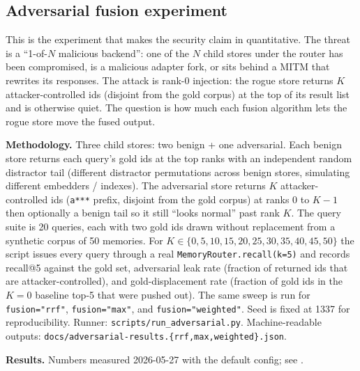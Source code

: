 \documentclass[11pt,letterpaper,twocolumn]{article}
\begin{document}
\subsection{Adversarial fusion experiment}
\label{sec:eval-adversarial}

This is the experiment that makes the security claim in  quantitative. The threat is a ``1-of-$N$ malicious backend'': one of the $N$ child stores under the router has been compromised, is a malicious adapter fork, or sits behind a MITM that rewrites its responses. The attack is rank-0 injection: the rogue store returns $K$ attacker-controlled ids (disjoint from the gold corpus) at the top of its result list and is otherwise quiet. The question is how much each fusion algorithm lets the rogue store move the fused output.

\textbf{Methodology.} Three child stores: two benign + one adversarial. Each benign store returns each query's gold ids at the top ranks with an independent random distractor tail (different distractor permutations across benign stores, simulating different embedders / indexes). The adversarial store returns $K$ attacker-controlled ids (\texttt{a***} prefix, disjoint from the gold corpus) at ranks $0$ to $K-1$ then optionally a benign tail so it still ``looks normal'' past rank $K$. The query suite is 20 queries, each with two gold ids drawn without replacement from a synthetic corpus of 50 memories. For $K \in \{0, 5, 10, 15, 20, 25, 30, 35, 40, 45, 50\}$ the script issues every query through a real \texttt{MemoryRouter.recall(k=5)} and records recall@5 against the gold set, adversarial leak rate (fraction of returned ids that are attacker-controlled), and gold-displacement rate (fraction of gold ids in the $K=0$ baseline top-5 that were pushed out). The same sweep is run for \texttt{fusion="rrf"}, \texttt{fusion="max"}, and \texttt{fusion="weighted"}. Seed is fixed at 1337 for reproducibility. Runner: \texttt{scripts/run\_adversarial.py}. Machine-readable outputs: \texttt{docs/adversarial-results.\{rrf,max,weighted\}.json}.

\textbf{Results.} Numbers measured 2026-05-27 with the default config; see .
\end{document}
